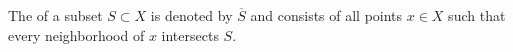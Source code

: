 The  of a subset $S \subset X$ is denoted by $\overline{S}$ and consists of all points $x \in X$ such that every neighborhood of $x$ intersects $S$.
